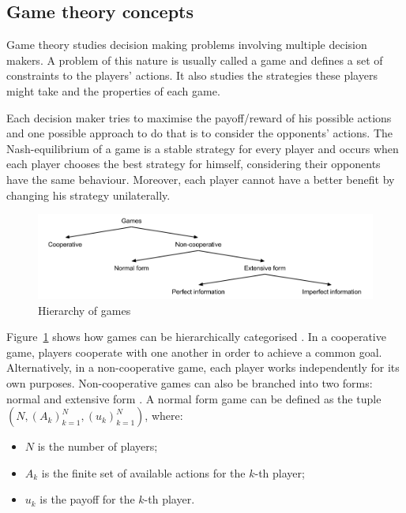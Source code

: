 \subsection{Game theory concepts}

Game theory studies decision making problems involving multiple decision makers.
A problem of this nature is usually called a game and defines a set of constraints to the players' actions.
It also studies the strategies these players might take and the properties of each game.

Each decision maker tries to maximise the payoff/reward of his possible actions and one possible approach to do that is to consider the opponents' actions.
The Nash-equilibrium \cite{Nash1950} of a game is a stable strategy for every player and occurs when each player chooses the best strategy for himself, considering their opponents have the same behaviour.
Moreover, each player cannot have a better benefit by changing his strategy unilaterally.

\begin{figure}
\centering
\includegraphics[width=1\textwidth]{./img/gamesHierarchy}
\caption{Hierarchy of games}
\label{fig:games}
\end{figure}

Figure~\ref{fig:games} shows how games can be hierarchically categorised \cite{Osborne2011}.
In a cooperative game, players cooperate with one another in order to achieve a common goal.
Alternatively, in a non-cooperative game, each player works independently for its own purposes.
Non-cooperative games can also be branched into two forms: normal and extensive form \cite{Shoham2010}.
A normal form game can be defined as the tuple $(N,(A_k)_{k=1}^{N},(u_k)_{k=1}^{N})$, where:

\begin{itemize}
\item $N$ is the number of players;
\item $A_k$ is the finite set of available actions for the $k$-th player;
\item $u_k$ is the payoff for the $k$-th player.
\end{itemize}

